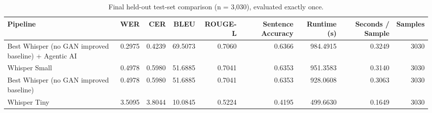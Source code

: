 \begin{table}
\caption{Final held-out test-set comparison (n = 3,030), evaluated exactly once.}
\label{tab:table_5_final_test_results}
\begin{tabular}{lrrrrrrrr}
\toprule
Pipeline & WER & CER & BLEU & ROUGE-L & Sentence Accuracy & Runtime (s) & Seconds / Sample & Samples \\
\midrule
Best Whisper (no GAN improved baseline) + Agentic AI & 0.2975 & 0.4239 & 69.5073 & 0.7060 & 0.6366 & 984.4915 & 0.3249 & 3030 \\
Whisper Small & 0.4978 & 0.5980 & 51.6885 & 0.7041 & 0.6353 & 951.3583 & 0.3140 & 3030 \\
Best Whisper (no GAN improved baseline) & 0.4978 & 0.5980 & 51.6885 & 0.7041 & 0.6353 & 928.0608 & 0.3063 & 3030 \\
Whisper Tiny & 3.5095 & 3.8044 & 10.0845 & 0.5224 & 0.4195 & 499.6630 & 0.1649 & 3030 \\
\bottomrule
\end{tabular}
\end{table}
